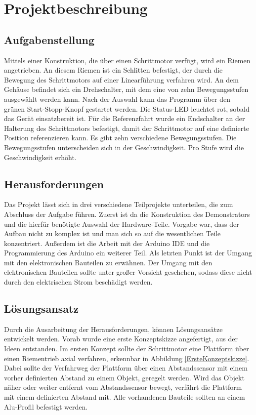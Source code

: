 %
%
%


\chapter{Projektbeschreibung}

\section{Aufgabenstellung}

Mittels einer Konstruktion, die über einen Schrittmotor verfügt, wird ein Riemen angetrieben. An diesem Riemen ist ein Schlitten befestigt, der durch die Bewegung des Schrittmotors auf einer Linearführung verfahren wird. An dem Gehäuse befindet sich ein Drehschalter, mit dem eine von zehn Bewegungsstufen ausgewählt werden kann. Nach der Auswahl kann das Programm über den grünen Start-Stopp-Knopf gestartet werden. Die Status-LED leuchtet rot, sobald das Gerät einsatzbereit ist. Für die Referenzfahrt wurde ein Endschalter an der Halterung des Schrittmotors befestigt, damit der Schrittmotor auf eine definierte Position referenzieren kann. Es gibt zehn verschiedene Bewegungsstufen. Die Bewegungsstufen unterscheiden sich in der Geschwindigkeit. Pro Stufe wird die Geschwindigkeit erhöht. 

\section{Herausforderungen}

Das Projekt lässt sich in drei verschiedene Teilprojekte unterteilen, die zum Abschluss der Aufgabe führen. Zuerst ist da die Konstruktion des Demonstrators und die hierfür benötigte Auswahl der Hardware-Teile. Vorgabe war, dass der Aufbau nicht zu komplex ist und man sich so auf die wesentlichen Teile konzentriert. Außerdem ist die Arbeit mit der Arduino IDE und die Programmierung des Arduino ein weiterer Teil. Als letzten Punkt ist der Umgang mit den elektronischen Bauteilen zu erwähnen. Der Umgang mit den elektronischen Bauteilen sollte unter großer Vorsicht geschehen, sodass diese nicht durch den elektrischen Strom beschädigt werden. 

\section{Lösungsansatz}
Durch die Ausarbeitung der Herausforderungen, können Lösungsansätze entwickelt werden. Vorab wurde eine erste Konzeptskizze angefertigt, aus der Ideen entstanden. Im ersten Konzept sollte der Schrittmotor eine Plattform über einen Riementrieb axial verfahren, erkennbar in Abbildung \ref{ErsteKonzeptskizze}. Dabei sollte der Verfahrweg der Plattform über einen Abstandssensor mit einem vorher definierten Abstand zu einem Objekt, geregelt werden. Wird das Objekt näher oder weiter entfernt vom Abstandssensor bewegt, verfährt die Plattform mit einem definierten Abstand mit. Alle vorhandenen Bauteile sollten an einem Alu-Profil befestigt werden.

